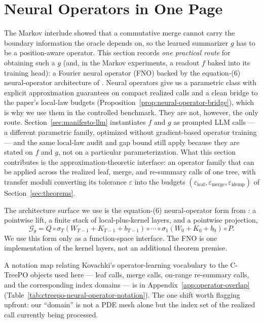 \section{Neural Operators in One Page}\label{sec:fno-primer}

The Markov interlude showed that a commutative merge cannot carry the
boundary information the oracle depends on, so the learned summarizer
$g$ has to be a position-aware operator. This section records \emph{one
practical route} for obtaining such a $g$ (and, in the Markov
experiments, a readout $f$ baked into its training head): a Fourier
neural operator (FNO) backed by the equation-(6) neural-operator
architecture of \citet{Kovachki23NeuralOperator}. Neural operators give
us a parametric class with explicit approximation guarantees on compact
realized calls and a clean bridge to the paper's local-law budgets
(Proposition~\ref{prop:neural-operator-bridge}), which is why we use
them in the controlled benchmark. They are not, however, the only
route. Section~\ref{sec:manifesto-llm} instantiates $f$ and $g$ as
prompted LLM calls --- a different parametric family, optimized without
gradient-based operator training --- and the same local-law audit and
gap bound still apply because they are stated on $f$ and $g$, not on a
particular parameterization. What this section contributes is the
approximation-theoretic interface: an operator family that can be
applied across the realized leaf, merge, and re-summary calls of one
tree, with transfer moduli converting its tolerance $\varepsilon$ into
the budgets $(\varepsilon_{\mathrm{leaf}}, \varepsilon_{\mathrm{merge}},
\varepsilon_{\mathrm{idemp}})$ of Section~\ref{sec:theorems}.

The architecture surface we use is the equation-(6) neural-operator form
from \citet{Kovachki23NeuralOperator}: a pointwise lift, a finite stack
of local-plus-kernel layers, and a pointwise projection,
\begin{equation}\label{eq:equation6-no}
\mathcal{G}_{\theta}
  =
  Q \circ
  \sigma_T(W_{T-1}+K_{T-1}+b_{T-1})
  \circ \cdots \circ
  \sigma_1(W_0+K_0+b_0)
  \circ P .
\end{equation}
We use this form only as a function-space interface. The FNO is one
implementation of the kernel layers, not an additional theorem premise.

A notation map relating Kovachki's operator-learning vocabulary to the
C-TreePO objects used here --- leaf calls, merge calls, on-range
re-summary calls, and the corresponding index domains --- is in
Appendix~\ref{app:operator-overlap} (Table~\ref{tab:ctreepo-neural-operator-notation}).
The one shift worth flagging upfront: our ``domain'' is not a PDE mesh
alone but the index set of the realized call currently being processed.

